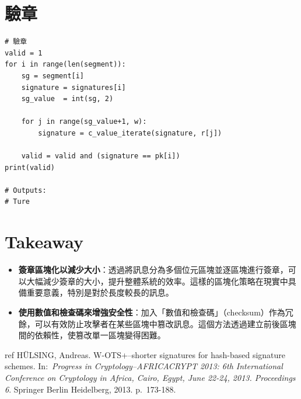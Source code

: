\documentclass[
]{article}
\begin{document}
\hypertarget{ux9a57ux7ae0-1}{%
\section{驗章}\label{ux9a57ux7ae0-1}}

\begin{verbatim}
# 驗章
valid = 1
for i in range(len(segment)):
    sg = segment[i]
    signature = signatures[i]
    sg_value  = int(sg, 2)

    for j in range(sg_value+1, w):
        signature = c_value_iterate(signature, r[j])
    
    valid = valid and (signature == pk[i])
print(valid)

# Outputs:
# Ture
\end{verbatim}

\hypertarget{takeaway}{%
\section{Takeaway}\label{takeaway}}

\begin{itemize}
\item
  \textbf{簽章區塊化以減少大小}：透過將訊息分為多個位元區塊並逐區塊進行簽章，可以大幅減少簽章的大小，提升整體系統的效率。這樣的區塊化策略在現實中具備重要意義，特別是對於長度較長的訊息。
\item
  \textbf{使用數值和檢查碼來增強安全性}：加入「數值和檢查碼」（checksum）作為冗餘，可以有效防止攻擊者在某些區塊中篡改訊息。這個方法透過建立前後區塊間的依賴性，使篡改單一區塊變得困難。
\end{itemize}

ref HÜLSING, Andreas. W-OTS+--shorter signatures for hash-based
signature schemes. In:~\emph{Progress in Cryptology--AFRICACRYPT 2013:
6th International Conference on Cryptology in Africa, Cairo, Egypt, June
22-24, 2013. Proceedings 6}. Springer Berlin Heidelberg, 2013.
p.~173-188.
\end{document}
